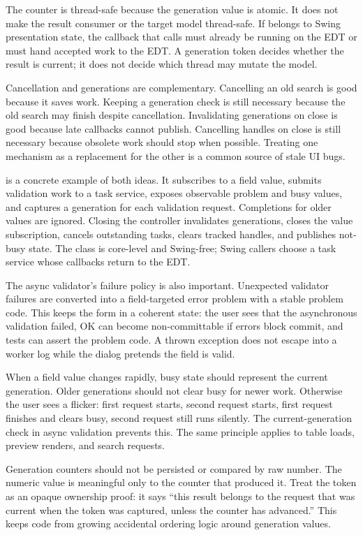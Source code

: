 The counter is thread-safe because the generation value is atomic. It does not
make the result consumer or the target model thread-safe. If 
belongs to Swing presentation state, the callback that calls 
must already be running on the EDT or must hand accepted work to the EDT. A
generation token decides whether the result is current; it does not decide
which thread may mutate the model.

Cancellation and generations are complementary. Cancelling an old search is
good because it saves work. Keeping a generation check is still necessary
because the old search may finish despite cancellation. Invalidating
generations on close is good because late callbacks cannot publish. Cancelling
handles on close is still necessary because obsolete work should stop when
possible. Treating one mechanism as a replacement for the other is a common
source of stale UI bugs.

 is a concrete example of both ideas. It subscribes
to a field value, submits validation work to a task service, exposes observable
problem and busy values, and captures a generation for each validation request.
Completions for older values are ignored. Closing the controller invalidates
generations, closes the value subscription, cancels outstanding tasks, clears
tracked handles, and publishes not-busy state. The class is core-level and
Swing-free; Swing callers choose a task service whose callbacks return to the
EDT.

The async validator's failure policy is also important. Unexpected validator
failures are converted into a field-targeted error problem with a stable
problem code. This keeps the form in a coherent state: the user sees that the
asynchronous validation failed, OK can become non-committable if errors block
commit, and tests can assert the problem code. A thrown exception does not
escape into a worker log while the dialog pretends the field is valid.

When a field value changes rapidly, busy state should represent the current
generation. Older generations should not clear busy for newer work. Otherwise
the user sees a flicker: first request starts, second request starts, first
request finishes and clears busy, second request still runs silently. The
current-generation check in async validation prevents this. The same principle
applies to table loads, preview renders, and search requests.

Generation counters should not be persisted or compared by raw number. The
numeric value is meaningful only to the counter that produced it. Treat the
token as an opaque ownership proof: it says ``this result belongs to the
request that was current when the token was captured, unless the counter has
advanced.'' This keeps code from growing accidental ordering logic around
generation values.

